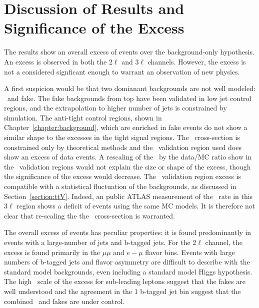 \section{Discussion of Results and Significance of the Excess}

The results show an overall excess of events over the background-only hypothesis. An excess is observed in both the 2$\ell$ and 3$\ell$ channels. However, the excess is not a considered signficant enough to warrant an observation of new physics.  

A first suspicion would be that two domianant backgrounds are not well modeled: \ttV\ and fake. The fake backgrounds from top have been validated in low jet control regions, and the extrapolation to higher number of jets is constrained by simulation. The anti-tight control regions, shown in Chapter~\ref{chapter:background}, which are enriched in fake events do not show a similar shape to the excesses in the tight signal regions. The \ttV\ cross-section is constrained only by theoretical methods and the \ttZ\ validation region used does show an excess of data events. A rescaling of the \ttV\ by the data/MC ratio show in the \ttZ\ validation regions would not explain the size or shape of the excess, though the significance of the excess would decrease. The \ttZ\ validation region excess is compatible with a statistical fluctuation of the backgrounds, as discussed in Section~\ref{section:ttV}. Indeed, an public ATLAS measurement of the \ttZ\ rate in this 3$\ell$ region shows a deficit of events \cite{ATLAS-CONF-2012-126} using the same MC models. It is therefore not clear that re-scaling the the \ttV\ cross-section is warranted. 

The overall excess of events has peculiar properties: it is found predominantly in events with a large-number of jets and b-tagged jets.  For the 2$\ell$ channel, the excess is found primarily in the $\mu\mu$ and $e-\mu$ flavor bins. Events with large numbers of b-tagged jets and flavor asymmetry are difficult to describe with the standard model backgrounds, even including a standard model Higgs hypothesis. The high \pt\ scale of the excess for sub-leading leptons suggest that the fakes are well understood and the agreement in the 1 b-tagged jet bin suggest that the combined \ttV\ and fakes are under control. 


